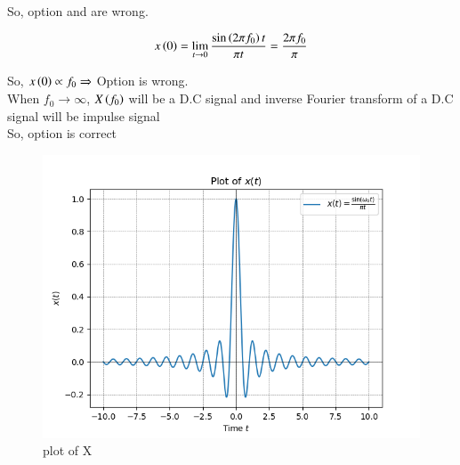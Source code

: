 \documentclass[journal,12pt,twocolumn]{IEEEtran}
\theoremstyle{remark}
\begin{document}
So, option  and  are wrong.

\begin{align}
x\left(0\right)=\lim_{t\to 0}\frac{\sin \left(2\pi f_{0}\right) t}{\pi t}=\frac{2\pi f_{0}}{\pi}
\end{align}

So, $x\left(0\right) \propto f_{0} \Rightarrow$ Option  is wrong.\\

When $f_{0}\rightarrow \infty$, $X\left(f_{0}\right)$ will be a D.C signal and inverse Fourier transform of a D.C signal will be impulse signal\\[3ex]
So, option  is correct
\begin{figure}[ht]
    \centering
    \includegraphics[width=1\columnwidth]{2023/EE/18/figs/main.png}
    \caption{plot of X}
    \label{fig:EE18.1}
\end{figure}
\end{document}
